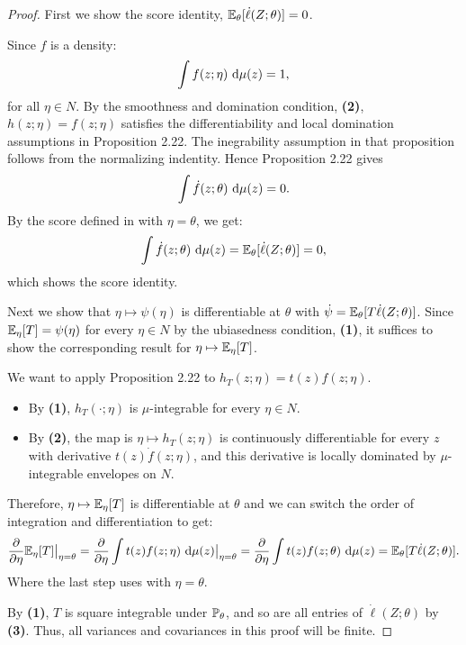 \global\def\lastproofcolor{theorembordercolor}
\begin{proof}
  First we show the score identity, $\E_{\theta}[\dot\ell(Z;\theta) ]= 0$.

  Since $f$ is a density:
  \[ 
  \int f(z;\eta) \d \mu(z) = 1
  ,\]
   for all $\eta \in N$. By the smoothness and domination condition, \textbf{(2)}, $h(z;\eta) =
   f(z;\eta)$ satisfies the differentiability and local domination assumptions in Proposition 2.22.
   The inegrability assumption in that proposition follows from the normalizing indentity. Hence
   Proposition 2.22 gives
   \[ 
   \int \dot f(z;\theta) \d \mu(z) = 0
   .\]
   By the score defined in  with $\eta = \theta$, we get:
   \[ 
     \int \dot f(z;\theta) \d \mu(z) = \E_{\theta}[\dot \ell(Z;\theta)]= 0
   ,\]
   which shows the score identity.

   Next we show that $\eta \mapsto \psi(\eta)$ is differentiable at $\theta$ with $\dot \psi =
   \E_{\theta}[T \dot \ell(Z;\theta)]$. Since $\E_{\eta}[T] = \psi(\eta)$ for every $\eta \in N$ by
   the ubiasedness condition, \textbf{(1)}, it suffices to show the corresponding result for $\eta
   \mapsto  \E_{\eta}[T]$. 

   We want to apply Proposition 2.22 to $h_T(z;\eta) = t(z) f(z;\eta)$. 
   \begin{itemize}
   \item By \textbf{(1)}, $h_T(\cdot ;\eta)$ is $\mu$-integrable for every $\eta \in N$. 
    \item By \textbf{(2)}, the map is $\eta \mapsto h_T(z;\eta)$ is continuously differentiable for
      every $z$ with derivative $t(z) \dot f(z;\eta)$, and this derivative is locally dominated by
   $\mu$-integrable envelopes on $N$. 
   \end{itemize}
   Therefore, $\eta \mapsto \E_{\eta}[T]$ is differentiable at $\theta$ and we can switch the order
   of integration and differentiation to get:
   \[ 
     \frac{\partial }{\partial \eta} \E_{\eta}[T] \big|_{\eta = \theta} 
     = \frac{\partial }{\partial \eta} \int t(z)f(z;\eta) \d\mu (z) \big|_{\eta =\theta}
     = \frac{\partial }{\partial \eta} \int t(z)f(z;\theta) \d\mu (z) 
     = \E_{\theta}[T \dot\ell(Z;\theta)]
   .\]
   Where the last step uses  with $\eta= \theta$.

   By \textbf{(1)}, $T$ is square integrable under $\P_{\theta}$, and so are all entries of $\dot
   \ell(Z;\theta)$  by \textbf{(3)}. Thus, all variances and covariances in this proof will be
   finite.


\end{proof}
